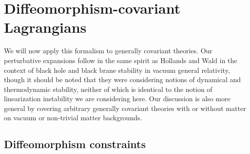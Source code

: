 \documentclass[]{jkpaper}
\theoremstyle{plain}
\theoremstyle{definition}
\begin{document}
\section{Diffeomorphism-covariant Lagrangians}

We will now apply this formalism to generally covariant theories. Our perturbative expansions follow in the same spirit as Hollands and Wald \cite{Hollands:2012sf} in the context of black hole and black brane stability in vacuum general relativity, though it should be noted that they were considering notions of dynamical and thermodynamic stability, neither of which is identical to the notion of linearization instability we are considering here. Our discussion is also more general by covering arbitrary generally covariant theories with or without matter on vacuum or non-trivial matter backgrounds.




\subsection{Diffeomorphism constraints}\label{subsec: diffeomorphism covariant Lagrangians}
\end{document}
